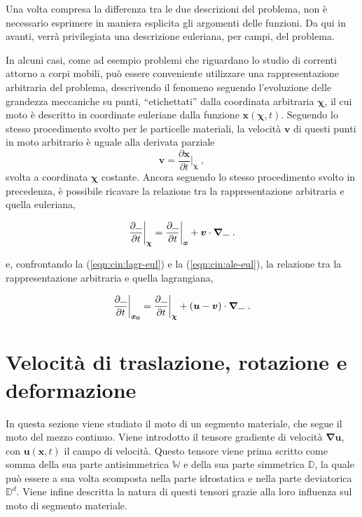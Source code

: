 \begin{remark}
 Una volta compresa la differenza tra le due descrizioni del problema, non è necessario esprimere in maniera esplicita gli argomenti delle funzioni. Da qui in avanti, verrà privilegiata una descrizione euleriana, per campi, del problema.
\end{remark}
%
In alcuni casi, come ad esempio problemi che riguardano lo studio di correnti attorno a corpi mobili, può essere conveniente utilizzare una rappresentazione arbitraria del problema, descrivendo il fenomeno seguendo l'evoluzione delle grandezza meccaniche su punti, ``etichettati'' dalla coordinata arbitraria $\bm{\chi}$, il cui moto è descritto in coordinate euleriane dalla funzione $\bm{x}(\bm{\chi},t)$. Seguendo lo stesso procedimento svolto per le particelle materiali, la velocità $\bm{v}$ di questi punti in moto arbitrario è uguale alla derivata parziale
\begin{equation}
 \bm{v} = \dfrac{\partial \bm{x}}{\partial t} \bigg|_{\bm{\chi}} \ ,
\end{equation}
svolta a coordinata $\bm{\chi}$ costante. Ancora seguendo lo stesso procedimento svolto in precedenza, è possibile ricavare la relazione tra la rappresentazione arbitraria e quella euleriana,
\begin{fBox}
\begin{equation}\label{eqn:cin:ale-eul}
 \dfrac{\partial \rule{1.5ex}{.4pt}}{\partial t} \bigg|_{\bm{\chi}} = \dfrac{\partial \rule{1.5ex}{.4pt}}{\partial t} \bigg|_{\bm{x}} + \bm{v} \cdot \bm{\nabla} \rule{1.5ex}{.4pt} \ .
\end{equation}
\end{fBox}
e, confrontando la (\ref{eqn:cin:lagr-eul}) e la (\ref{eqn:cin:ale-eul}), la relazione tra la rappresentazione arbitraria e quella lagrangiana,
\begin{fBox}
\begin{equation}
  \dfrac{\partial \rule{1.5ex}{.4pt}}{\partial t} \bigg|_{\bm{x_0}} = \dfrac{\partial \rule{1.5ex}{.4pt}}{\partial t} \bigg|_{\bm{\chi}} + (\bm{u} - \bm{v}) \cdot \bm{\nabla} \rule{1.5ex}{.4pt} \ .
\end{equation}
\end{fBox}

\section{Velocità di traslazione, rotazione e deformazione}
In questa sezione viene studiato il moto di un segmento materiale, che segue il moto del mezzo continuo. Viene introdotto il tensore gradiente di velocità $\bm{\nabla}\bm{u}$, con $\bm{u}(\bm{x},t)$ il campo di velocità. Questo tensore viene prima scritto come somma della sua parte antisimmetrica $\mathbb{W}$ e della sua parte simmetrica $\mathbb{D}$, la quale può essere a sua volta scomposta nella parte idrostatica e nella parte deviatorica $\mathbb{D}^d$. Viene infine descritta la natura di questi tensori grazie alla loro influenza sul moto di segmento materiale. 

